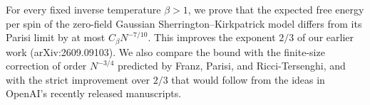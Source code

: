For every fixed inverse temperature $\beta>1$, we prove that the expected free
energy per spin of the zero-field Gaussian Sherrington--Kirkpatrick model
differs from its Parisi limit by at most $C_\beta N^{-7/10}$. This improves
the exponent $2/3$ of our earlier work (arXiv:2609.09103). We also compare the
bound with the finite-size correction of order $N^{-3/4}$ predicted by Franz,
Parisi, and Ricci-Tersenghi, and with the strict improvement over $2/3$ that
would follow from the ideas in OpenAI's recently released manuscripts.
